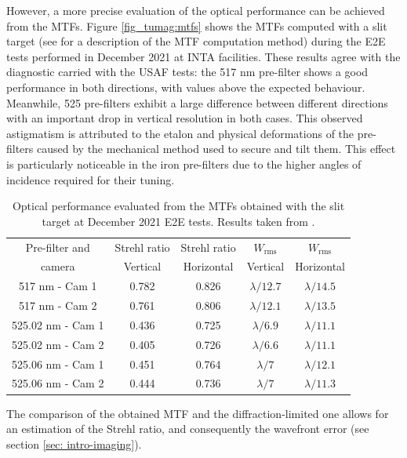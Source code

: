 However, a more precise evaluation of the optical performance can be achieved from the MTFs. Figure \ref{fig_tumag:mtfs} shows the MTFs computed with a slit target (see \citealt{slanted-method} for a description of the MTF computation method) during the E2E tests performed in December 2021 at INTA facilities. These results agree with the diagnostic carried with the USAF tests: the 517 nm pre-filter shows a good performance in both directions, with values above the expected behaviour. Meanwhile, 525 pre-filters exhibit a large difference between different directions with an important drop in vertical resolution in both cases. This observed astigmatism is attributed to the etalon and physical deformations of the pre-filters caused by the mechanical method used to secure and tilt them. This effect is particularly noticeable in the iron pre-filters due to the higher angles of incidence required for their tuning.

\begin{table}[t]
    \centering
   \begin{tabular}{ccccc}
    \hline
    \hline
    Pre-filter and & Strehl ratio & Strehl ratio & $W_{\text{rms}}$& $W_{\text{rms}}$\\
    camera & Vertical & Horizontal & Vertical & Horizontal\\
    \hline
    517 nm - Cam 1 & 0.782 & 0.826 & $\lambda/12.7$ & $\lambda/14.5$ \\
    517 nm - Cam 2 & 0.761 & 0.806 & $\lambda/12.1$ & $\lambda/13.5$ \\
    525.02 nm - Cam 1 & 0.436 & 0.725 & $\lambda/6.9$ & $\lambda/11.1$ \\
    525.02 nm - Cam 2 & 0.405 & 0.726 & $\lambda/6.6$ & $\lambda/11.1$ \\
    525.06 nm - Cam 1 & 0.451 & 0.764 & $\lambda/7$ & $\lambda/12.1$ \\
    525.06 nm - Cam 2 & 0.444 & 0.736 & $\lambda/7$ & $\lambda/11.3$ \\
    \hline
    \hline
    \end{tabular}
    \caption{Optical performance evaluated from the MTFs obtained with the slit target at December 2021 E2E tests. Results taken from \citep{e2e-tests-inta}.}
    \label{table: Optical-performance}
\end{table}


The comparison of the obtained MTF and the diffraction-limited one allows for an estimation of the Strehl ratio, and consequently the wavefront error (see section \ref{sec: intro-imaging}).

